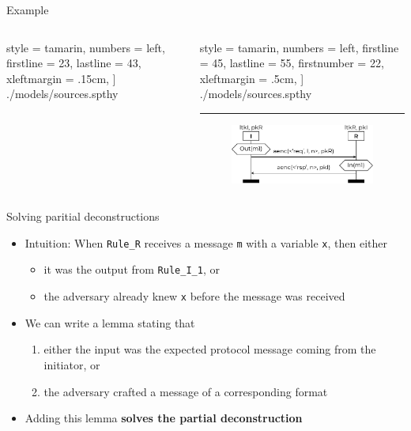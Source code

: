 \documentclass[11pt,aspectratio=169]{beamer}
\begin{document}
\begin{frame}[fragile,t]{Example}
    \begin{columns}
        \begin{column}{0.5\textwidth}
            
                style = tamarin,
                numbers = left,
                firstline = 23,
                lastline  = 43,
                xleftmargin = .15cm,
            ] {./models/sources.spthy}
        \end{column}
        \begin{column}{0.5\textwidth}
            
                style = tamarin,
                numbers = left,
                firstline = 45,
                lastline  = 55,
                firstnumber = 22,
                xleftmargin = .5cm,
            ] {./models/sources.spthy}
            \vspace*{.25cm}
            \hrule
            \begin{figure}
                \includegraphics[width=.8\textwidth]{./figures/lecture_8/sources_2}
            \end{figure}
        \end{column}
    \end{columns}
    \vsep
\end{frame}

\begin{frame}[fragile]{Solving paritial deconstructions}
    \begin{itemize}
        \item Intuition: When \verb|Rule_R| receives a message \verb|m| with a 
              variable \verb|x|, then either
        \begin{itemize}
            \item it was the output from \verb|Rule_I_1|, or
            \item the adversary already knew \verb|x| before the message was 
                  received
        \end{itemize}
        \item We can write a lemma stating that
        \begin{enumerate}
            \item either the input was the expected protocol message coming 
                  from the initiator, or
            \item the adversary crafted a message of a corresponding format
        \end{enumerate}
        \item Adding this lemma \textbf{solves the partial deconstruction}
    \end{itemize}
\end{frame}
\end{document}
